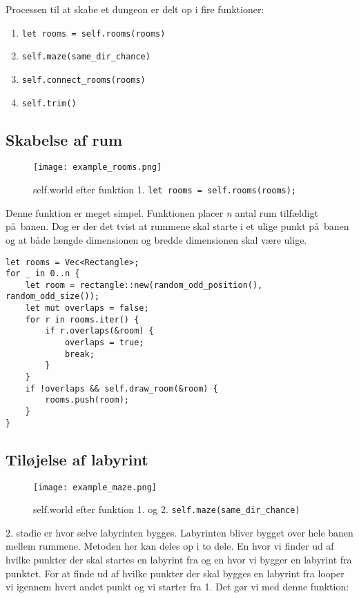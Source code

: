 \documentclass[12pt]{article}
\begin{document}
Processen til at skabe et dungeon er delt op i fire funktioner:

\begin{enumerate}
	\item \texttt{let rooms = self.rooms(rooms)}
	\item \texttt{self.maze(same_dir_chance)}
	\item \texttt{self.connect_rooms(rooms)}
	\item \texttt{self.trim()}
\end{enumerate}

\vfill
\pagebreak

\subsection{Skabelse af rum}

\begin{figure}[h]
	\centering
	\texttt{[image: example\_rooms.png]}
	\caption{self.world efter funktion 1. \texttt{let rooms = self.rooms(rooms);}}
\end{figure}

Denne funktion er meget simpel. Funktionen placer \textit{n} antal rum tilf\ae ldigt p\aa\ banen. Dog er der det tvist at rummene skal starte i et ulige punkt p\aa\ banen og at b\aa de l\ae ngde dimensionen og bredde dimensionen skal v\ae re ulige.

\begin{verbatim}
let rooms = Vec<Rectangle>;
for _ in 0..n {
    let room = rectangle::new(random_odd_position(), random_odd_size());
    let mut overlaps = false;
    for r in rooms.iter() {
        if r.overlaps(&room) {
            overlaps = true;
            break;
        }
    }
    if !overlaps && self.draw_room(&room) {
        rooms.push(room);
    }
}
\end{verbatim}

\subsection{Til\o jelse af labyrint}

\begin{figure}[h]
	\centering
	\texttt{[image: example\_maze.png]}
	\caption{self.world efter funktion 1. og 2. \texttt{self.maze(same_dir_chance)}}
\end{figure}

2. stadie er hvor selve labyrinten bygges. Labyrinten bliver bygget over hele banen mellem rummene. Metoden her kan deles op i to dele. En hvor vi finder ud af hvilke punkter der skal startes en labyrint fra og en hvor vi bygger en labyrint fra punktet. For at finde ud af hvilke punkter der skal bygges en labyrint fra looper vi igennem hvert andet punkt og vi starter fra 1. Det g\o r vi med denne funktion:
\end{document}
